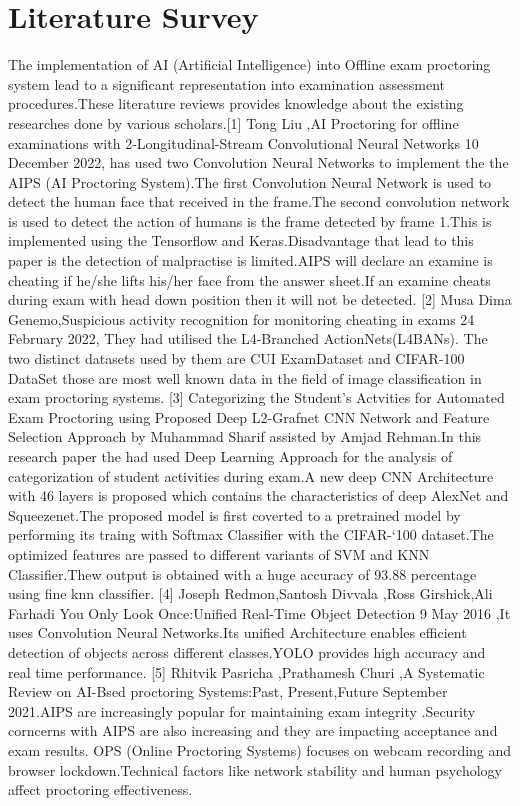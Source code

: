\documentclass[conference]{IEEEtran}
\begin{document}
\section{Literature Survey}
The implementation of AI (Artificial Intelligence) into Offline exam proctoring system lead to a significant representation into examination assessment procedures.These literature reviews provides knowledge about the existing researches done by various scholars.[1] Tong Liu ,AI Proctoring for offline examinations with 2-Longitudinal-Stream Convolutional Neural Networks 10 December 2022, has used two  Convolution Neural Networks to implement the 
the AIPS (AI Proctoring System).The first Convolution Neural Network is used to detect the human face that received in the frame.The second convolution network is used to detect the action of humans is the frame detected by frame 1.This is implemented using the Tensorflow and Keras.Disadvantage that lead to this paper is the detection of malpractise is limited.AIPS will declare an examine is cheating if he/she lifts his/her face from the answer sheet.If an examine cheats during exam with head down position then it will not be detected.
[2] Musa Dima Genemo,Suspicious activity recognition for monitoring cheating in exams 24 February 2022, They had utilised the L4-Branched ActionNets(L4BANs).
The two distinct datasets used by them are CUI ExamDataset and CIFAR-100 DataSet those are most well known data in the field of image classification in exam proctoring systems.
[3] Categorizing the Student's Actvities for  Automated Exam Proctoring using Proposed Deep L2-Grafnet CNN Network and Feature Selection Approach by Muhammad Sharif assisted by Amjad Rehman.In this research paper the had used Deep Learning Approach for the analysis of categorization of student activities during exam.A new deep CNN Architecture  with 46 layers is proposed which contains the characteristics of deep AlexNet and Squeezenet.The proposed model is first coverted to a pretrained model by performing its traing with Softmax Classifier with the CIFAR-`100 dataset.The optimized features are passed to different variants of SVM and KNN Classifier.Thew output is obtained with a huge accuracy of 93.88 percentage using fine knn classifier.
  [4] Joseph Redmon,Santosh Divvala ,Ross Girshick,Ali Farhadi You Only Look Once:Unified Real-Time Object Detection 9 May 2016 ,It uses Convolution Neural Networks.Its unified Architecture enables efficient detection of objects across different classes.YOLO provides high accuracy and real time performance. [5] Rhitvik Pasricha ,Prathamesh  Churi ,A Systematic Review on AI-Bsed proctoring Systems:Past, Present,Future  September 2021.AIPS are increasingly popular for maintaining exam integrity .Security corncerns with AIPS are also increasing and they are impacting acceptance and exam results. OPS (Online Proctoring Systems) focuses on webcam recording and browser lockdown.Technical factors like network stability and human psychology affect proctoring effectiveness. 
\end{document}
